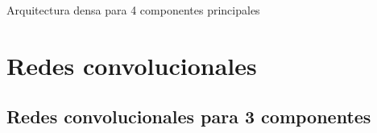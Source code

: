 \begin{table}[H]
\begin{center}
\end{center}
\caption{Arquitectura densa para 4 componentes principales}
\label{table:nn_4}
\end{table}


\section{Redes convolucionales}


\subsection{Redes convolucionales para 3 componentes}

\begin{table}[H]
\centering
\begin{center}


\end{center}
\end{table}
